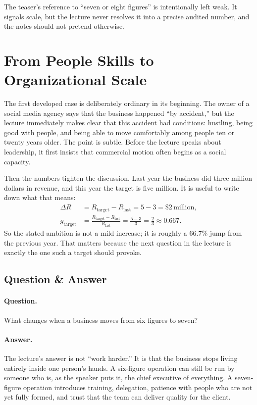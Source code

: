 \begin{remark}
The teaser's reference to ``seven or eight figures'' is intentionally left weak. It signals scale, but the lecture never resolves it into a precise audited number, and the notes should not pretend otherwise.
\end{remark}

\section{From People Skills to Organizational Scale}

The first developed case is deliberately ordinary in its beginning. The owner of a social media agency says that the business happened ``by accident,'' but the lecture immediately makes clear that this accident had conditions: hustling, being good with people, and being able to move comfortably among people ten or twenty years older. The point is subtle. Before the lecture speaks about leadership, it first insists that commercial motion often begins as a social capacity.

Then the numbers tighten the discussion. Last year the business did three million dollars in revenue, and this year the target is five million. It is useful to write down what that means:
\begin{align}
\Delta R
&=
R_{\text{target}}-R_{\text{last}}
=
5-3
=
\$2\,\text{million}, \\
g_{\text{target}}
&=
\frac{R_{\text{target}}-R_{\text{last}}}{R_{\text{last}}}
=
\frac{5-3}{3}
=
\frac{2}{3}
\approx 0.667.
\end{align}
So the stated ambition is not a mild increase; it is roughly a \(66.7\%\) jump from the previous year. That matters because the next question in the lecture is exactly the one such a target should provoke.

\subsection{Question \& Answer}

\paragraph{Question.} What changes when a business moves from six figures to seven?

\paragraph{Answer.} The lecture's answer is not ``work harder.'' It is that the business stops living entirely inside one person's hands. A six-figure operation can still be run by someone who is, as the speaker puts it, the chief executive of everything. A seven-figure operation introduces training, delegation, patience with people who are not yet fully formed, and trust that the team can deliver quality for the client.

